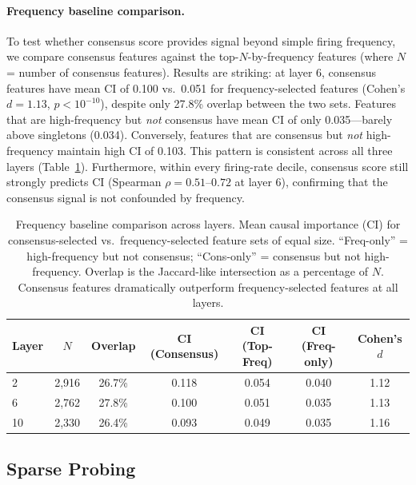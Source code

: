 \documentclass{article}
\begin{document}
\paragraph{Frequency baseline comparison.} To test whether consensus score provides signal beyond simple firing frequency, we compare consensus features against the top-$N$-by-frequency features (where $N$ = number of consensus features). Results are striking: at layer 6, consensus features have mean CI of 0.100 vs.\ 0.051 for frequency-selected features (Cohen's $d = 1.13$, $p < 10^{-10}$), despite only 27.8\% overlap between the two sets. Features that are high-frequency but \emph{not} consensus have mean CI of only 0.035---barely above singletons (0.034). Conversely, features that are consensus but \emph{not} high-frequency maintain high CI of 0.103. This pattern is consistent across all three layers (Table~\ref{tab:freq}). Furthermore, within every firing-rate decile, consensus score still strongly predicts CI (Spearman $\rho = 0.51$--$0.72$ at layer 6), confirming that the consensus signal is not confounded by frequency.

\begin{table}[t]
\caption{Frequency baseline comparison across layers. Mean causal importance (CI) for consensus-selected vs.\ frequency-selected feature sets of equal size. ``Freq-only'' = high-frequency but not consensus; ``Cons-only'' = consensus but not high-frequency. Overlap is the Jaccard-like intersection as a percentage of $N$. Consensus features dramatically outperform frequency-selected features at all layers.}
\label{tab:freq}
\centering
\small
\begin{tabular}{lcccccc}
\toprule
Layer & $N$ & Overlap & CI (Consensus) & CI (Top-Freq) & CI (Freq-only) & Cohen's $d$ \\
\midrule
2  & 2{,}916 & 26.7\% & 0.118 & 0.054 & 0.040 & 1.12 \\
6  & 2{,}762 & 27.8\% & 0.100 & 0.051 & 0.035 & 1.13 \\
10 & 2{,}330 & 26.4\% & 0.093 & 0.049 & 0.035 & 1.16 \\
\bottomrule
\end{tabular}
\end{table}

\subsection{Sparse Probing}
\end{document}
